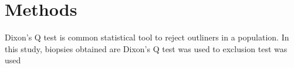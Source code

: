 \chapter{Methods}

Dixon's Q test is common statistical tool to reject outliners in a population. In this study, biopsies obtained are Dixon's Q test was used to   exclusion test was used 